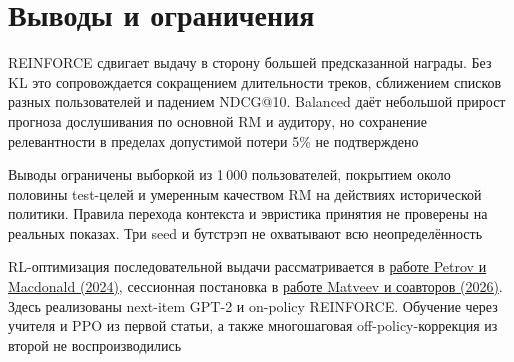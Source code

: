 \section{Выводы и ограничения}

REINFORCE сдвигает выдачу в сторону большей предсказанной награды.
Без KL это сопровождается сокращением длительности треков,
сближением списков разных пользователей и падением NDCG@10.
Balanced даёт небольшой прирост прогноза дослушивания
по основной RM и аудитору, но сохранение релевантности
в пределах допустимой потери 5\% не подтверждено

Выводы ограничены выборкой из 1\,000 пользователей,
покрытием около половины test-целей и умеренным качеством RM
на действиях исторической политики.
Правила перехода контекста и эвристика принятия не проверены
на реальных показах. Три seed и бутстрэп не охватывают всю неопределённость

RL-оптимизация последовательной выдачи рассматривается в
\href{https://arxiv.org/abs/2403.04875}{работе Petrov и Macdonald (2024)},
сессионная постановка в
\href{https://arxiv.org/abs/2607.02818}{работе Matveev и соавторов (2026)}.
Здесь реализованы next-item GPT-2 и on-policy REINFORCE.
Обучение через учителя и PPO из первой статьи,
а также многошаговая off-policy-коррекция из второй не воспроизводились
